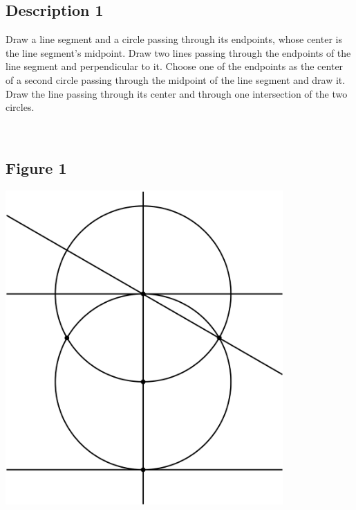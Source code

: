 \documentclass[12pt,a4paper,article,english,firamath]{nsi}
\begin{document}
\maketitle

\subsection*{Description 1}
{\brettley 

Draw a line segment and a circle passing through its endpoints, whose center is the line segment's midpoint.
Draw two lines passing through the endpoints of the line segment and perpendicular to it. Choose one of the endpoints as the center of a second circle passing through the midpoint of the line segment and draw it.
Draw the line passing through its center and through one intersection of the two circles.}\\[1em]



\subsection*{Figure 1}
\begin{center}
    \includegraphics[height=12cm]{img/fig01.png}
\end{center}
\end{document}
